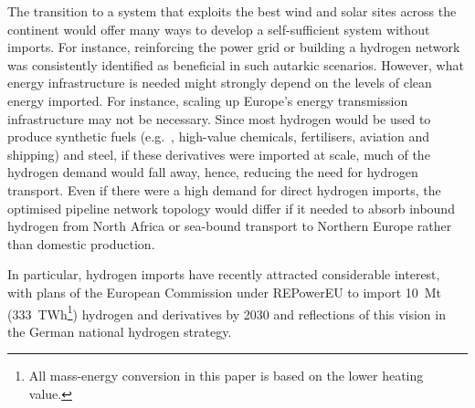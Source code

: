 
The transition to a system that exploits the best wind and solar sites across
the continent would offer many ways to develop a self-sufficient system without
imports.\cite{pickeringDiversityOptions2022,trondleHomemadeImported2019,brownSynergiesSector2018}
For instance, reinforcing the power grid or building a hydrogen network was
consistently identified as beneficial in such autarkic
scenarios.\cite{neumannPotentialRole2023,victoriaSpeedTechnological2022}
However, what energy infrastructure is needed might strongly depend on the
levels of clean energy imported. For instance, scaling up Europe's energy
transmission infrastructure may not be necessary. Since most hydrogen would be
used to produce synthetic fuels (e.g.~, high-value chemicals, fertilisers,
aviation and shipping) and steel,\cite{neumannPotentialRole2023} if these
derivatives were imported at scale, much of the hydrogen demand would fall away,
hence, reducing the need for hydrogen transport. Even if there were a high
demand for direct hydrogen imports, the optimised pipeline network topology
would differ if it needed to absorb inbound hydrogen from North Africa or
sea-bound transport to Northern Europe rather than domestic production.





In particular, hydrogen imports have recently attracted considerable interest,
with plans of the European Commission under
\mbox{REPowerEU}\cite{europeancommissionRepowerEUPlan} to import 10~Mt
(333~TWh\footnote{All mass-energy conversion in this paper is based on the lower
heating value.}) hydrogen and derivatives by 2030 and reflections of this vision
in the German national hydrogen
strategy.\cite{bundesministeriumfuerwirtschaftundklimaschutzFortschreibungNationalen2023}


